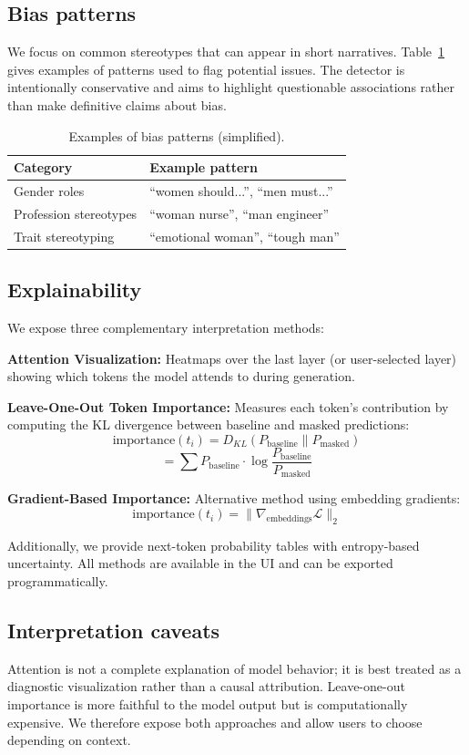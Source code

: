 \documentclass[conference]{IEEEtran}
\begin{document}
\subsection{Bias patterns}
We focus on common stereotypes that can appear in short narratives. Table~\ref{tab:bias} gives examples of patterns used to flag potential issues. The detector is intentionally conservative and aims to highlight questionable associations rather than make definitive claims about bias.

\begin{table}[t]
    \centering
    \caption{Examples of bias patterns (simplified).}
    \label{tab:bias}
    \begin{tabular}{lp{5.2cm}}
        \toprule
        Category & Example pattern \\
        \midrule
        Gender roles & ``women should...'', ``men must...'' \\
        Profession stereotypes & ``woman nurse'', ``man engineer'' \\
        Trait stereotyping & ``emotional woman'', ``tough man'' \\
        \bottomrule
    \end{tabular}
\end{table}

\subsection{Explainability}
We expose three complementary interpretation methods:

\textbf{Attention Visualization:} Heatmaps over the last layer (or user-selected layer) showing which tokens the model attends to during generation.

\textbf{Leave-One-Out Token Importance:} Measures each token's contribution by computing the KL divergence between baseline and masked predictions:
\[
\text{importance}(t_i) = D_{KL}(P_{\text{baseline}} \| P_{\text{masked}})
\]
\[
= \sum P_{\text{baseline}} \cdot \log \frac{P_{\text{baseline}}}{P_{\text{masked}}}
\]

\textbf{Gradient-Based Importance:} Alternative method using embedding gradients:
\[
\text{importance}(t_i) = \|\nabla_{\text{embeddings}} \mathcal{L}\|_2
\]

Additionally, we provide next-token probability tables with entropy-based uncertainty. All methods are available in the UI and can be exported programmatically.

\subsection{Interpretation caveats}
Attention is not a complete explanation of model behavior; it is best treated as a diagnostic visualization rather than a causal attribution. Leave-one-out importance is more faithful to the model output but is computationally expensive. We therefore expose both approaches and allow users to choose depending on context.
\end{document}
